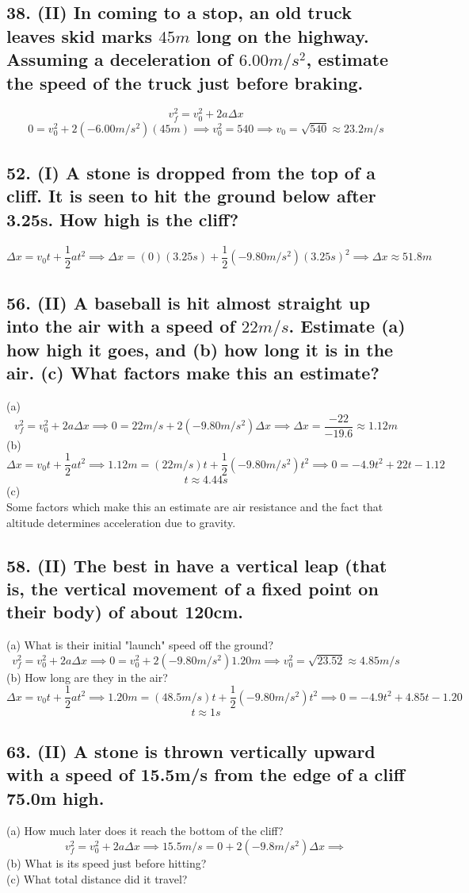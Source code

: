\documentclass[12pt,a4paper,english]{article}
\begin{document}
\begin{flushleft}
      \subsection{38. (II) In coming to a stop, an old truck leaves skid marks $45m$ long on the highway. Assuming a deceleration of $6.00m/s^2$, estimate the speed of the truck just before braking.}
      \[
        v_f^2=v_0^2+2a\Delta x
      \]
      \[
        0=v_0^2+2(-6.00m/s^2)(45m) \implies
        v_0^2=540 \implies v_0=\sqrt{540}\approx 23.2m/s
        \]
      \subsection{52. (I) A stone is dropped from the top of a cliff. It is seen to hit the ground below after 3.25s. How high is the cliff?}
      \[
        \Delta x=v_{0}t+\frac{1}{2}at^2 \implies 
        \Delta x=(0)(3.25s)+\frac{1}{2}(-9.80m/s^2)(3.25s)^2 \implies 
        \Delta x \approx 51.8m
      \]
      \subsection{56. (II) A baseball is hit almost straight up into the air with a speed of $22m/s$. Estimate (a) how high it goes, and (b) how long it is in the air. (c) What factors make this an estimate?}
      (a)
      \[
        v_{f}^2=v_{0}^2+2a\Delta x \implies
        0=22m/s+2(-9.80m/s^2)\Delta x \implies
        \Delta x = \frac{-22}{-19.6} \approx 1.12m
      \]
      (b)
      \[
        \Delta x=v_{0}t+\frac{1}{2}at^2 \implies
        1.12m=(22m/s)t+\frac{1}{2}(-9.80m/s^2)t^2 \implies
        0=-4.9t^2+22t-1.12
      \]
      \[
        t\approx 4.44s
      \]
      (c)\\
      Some factors which make this an estimate are air resistance and the fact that altitude determines acceleration due to gravity.
      \subsection{58. (II) The best  in  have a vertical leap (that is, the vertical movement of a fixed point on their body) of about 120cm.}
      (a) What is their initial "launch" speed off the ground?
      \[
        v_{f}^2=v_{0}^2+2a\Delta x\implies 
        0=v_0^2+2(-9.80m/s^2)1.20m \implies
        v_0^2=\sqrt{23.52}\approx 4.85m/s
      \]
      (b) How long are they in the air?
      \[
        \Delta x=v_{0}t+\frac{1}{2}at^2 \implies
        1.20m=(48.5m/s)t+\frac{1}{2}(-9.80m/s^2)t^2 \implies
        0=-4.9t^2+4.85t-1.20
    \]
    \[
        t \approx 1s
    \]
      \subsection{63. (II) A stone is thrown vertically upward with a speed of 15.5m/s from the edge of a cliff 75.0m high.}
      (a) How much later does it reach the bottom of the cliff?
      \[
        v_{f}^2=v_{0}^2+2a\Delta x\implies 
        15.5m/s=0+2(-9.8m/s^2)\Delta x\implies 
      \]
      (b) What is its speed just before hitting?
      \[
      \]
      (c) What total distance did it travel?
      \[
      \]
\end{flushleft}
\end{document}
